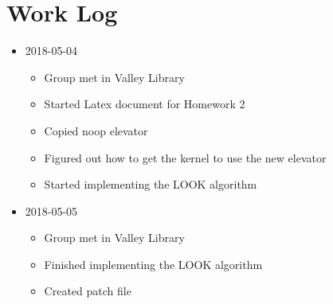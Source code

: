 \section{Work Log}
\begin{itemize}
\item 2018-05-04
	\begin{itemize}
	\item Group met in Valley Library
    \item Started Latex document for Homework 2
    \item Copied noop elevator
    \item Figured out how to get the kernel to use the new elevator
    \item Started implementing the LOOK algorithm
	\end{itemize}
\item 2018-05-05
	\begin{itemize}
    \item Group met in Valley Library
	\item Finished implementing the LOOK algorithm
    \item Created patch file
	\end{itemize}
\end{itemize}